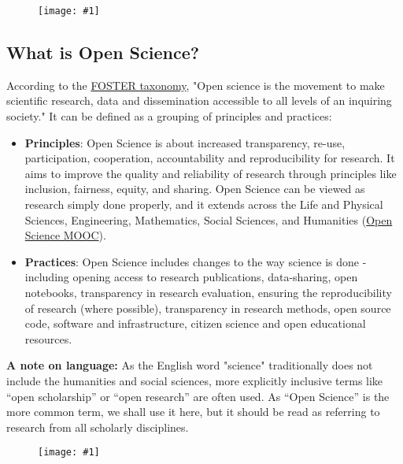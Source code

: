 \documentclass{article}
\newlength{\imgwidth}
\newcommand\scaledgraphics[2]{%
                
\settowidth{\imgwidth}{\texttt{[image: \#1]}}%
                
\setlength{\imgwidth}{\minof{\imgwidth}{#2\textwidth}}%
                
\texttt{[image: \#1]}%
                
}
\begin{document}
\begin{figure}
\scaledgraphics{2b202773-ec41-4cde-8558-44800112ec6d.png}{1}
\label{F92907571}
\end{figure}


\subsection{What is Open Science?}\label{what-is-open-science}



According to the \href{https://www.fosteropenscience.eu/taxonomy/term/7}{FOSTER taxonomy}, "Open science is the movement to make scientific research, data and dissemination accessible to all levels of an inquiring society." It can be defined as a grouping of principles and practices:

\begin{itemize}
\item \textbf{Principles}: Open Science is about increased transparency, re-use, participation, cooperation, accountability and reproducibility for research. It aims to improve the quality and reliability of research through principles like inclusion, fairness, equity, and sharing. Open Science can be viewed as research simply done properly, and it extends across the Life and Physical Sciences, Engineering, Mathematics, Social Sciences, and Humanities (\href{https://opensciencemooc.eu/}{Open Science MOOC}).


\item \textbf{Practices}: Open Science includes changes to the way science is done - including opening access to research publications, data-sharing, open notebooks, transparency in research evaluation, ensuring the reproducibility of research (where possible), transparency in research methods, open source code, software and infrastructure, citizen science and open educational resources.


\end{itemize}

\textbf{A note on language:} As the English word "science" traditionally does not include the humanities and social sciences, more explicitly inclusive terms like “open scholarship” or “open research” are often used. As “Open Science” is the more common term, we shall use it here, but it should be read as referring to research from all scholarly disciplines.

\begin{figure}
\scaledgraphics{033a4310-b8af-4b0c-8027-a8f72cb1a9c3.png}{1}
\label{F21609381}
\end{figure}
\end{document}
